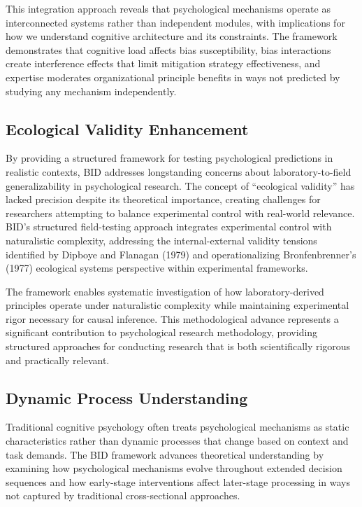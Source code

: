 \documentclass[
  authoryear,
  preprint]{elsarticle}
\begin{document}
This integration approach reveals that psychological mechanisms operate
as interconnected systems rather than independent modules, with
implications for how we understand cognitive architecture and its
constraints. The framework demonstrates that cognitive load affects bias
susceptibility, bias interactions create interference effects that limit
mitigation strategy effectiveness, and expertise moderates
organizational principle benefits in ways not predicted by studying any
mechanism independently.

\subsection{Ecological Validity
Enhancement}\label{ecological-validity-enhancement}

By providing a structured framework for testing psychological
predictions in realistic contexts, BID addresses longstanding concerns
about laboratory-to-field generalizability in psychological research.
The concept of ``ecological validity'' has lacked precision despite its
theoretical importance, creating challenges for researchers attempting
to balance experimental control with real-world relevance. BID's
structured field-testing approach integrates experimental control with
naturalistic complexity, addressing the internal-external validity
tensions identified by Dipboye and Flanagan (1979) and operationalizing
Bronfenbrenner's (1977) ecological systems perspective within
experimental frameworks.

The framework enables systematic investigation of how laboratory-derived
principles operate under naturalistic complexity while maintaining
experimental rigor necessary for causal inference. This methodological
advance represents a significant contribution to psychological research
methodology, providing structured approaches for conducting research
that is both scientifically rigorous and practically relevant.

\subsection{Dynamic Process
Understanding}\label{dynamic-process-understanding}

Traditional cognitive psychology often treats psychological mechanisms
as static characteristics rather than dynamic processes that change
based on context and task demands. The BID framework advances
theoretical understanding by examining how psychological mechanisms
evolve throughout extended decision sequences and how early-stage
interventions affect later-stage processing in ways not captured by
traditional cross-sectional approaches.
\end{document}
